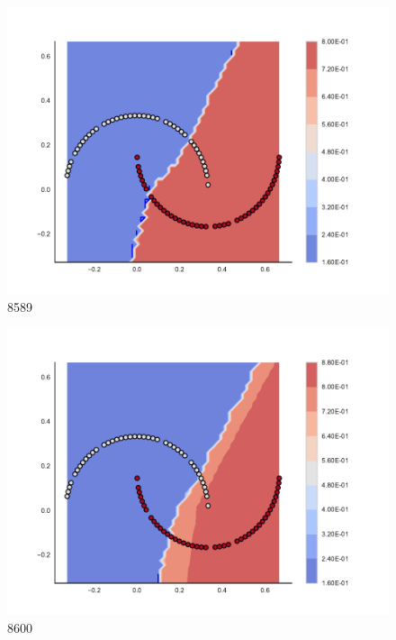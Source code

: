 \begin{subfigure}[b]{0.09\textwidth}
    \includegraphics[clip, trim=2.35cm 1.75cm 4.5cm 0cm,width=\textwidth]{img/convergence/8589.pdf}
    \caption{8589}
    \label{fig:convergence_8589}
\end{subfigure}
%
\begin{subfigure}[b]{0.09\textwidth}
    \includegraphics[clip, trim=2.35cm 1.75cm 4.5cm 0cm,width=\textwidth]{img/convergence/8600.pdf}
    \caption{8600}
    \label{fig:convergence_8600}
\end{subfigure}
%
